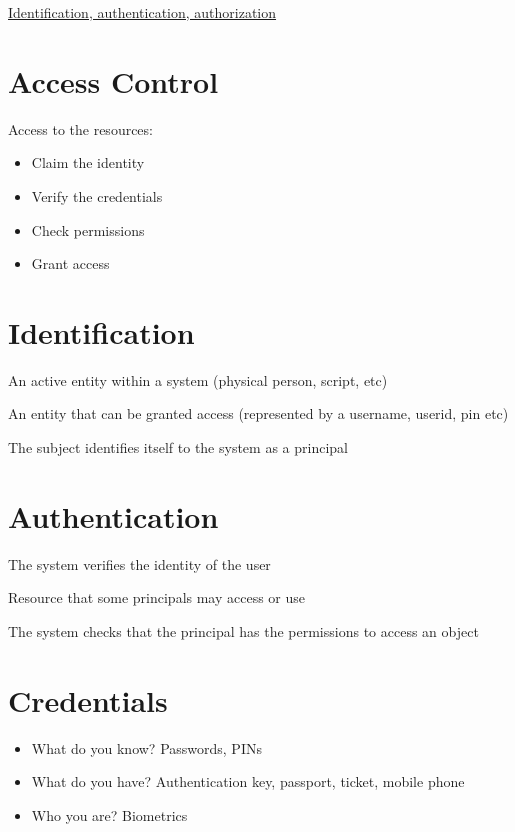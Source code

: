 \documentclass{article}[18pt]
\begin{document}
\begin{center}
\underline{\huge Identification, authentication, authorization}
\end{center}
\section{Access Control}
Access to the resources:
\begin{itemize}
	\item Claim the identity
	\item Verify the credentials
	\item Check permissions
	\item Grant access
\end{itemize}
\section{Identification}
\begin{defin}[Subject]
An active entity within a system (physical person, script, etc)	
\end{defin}
\begin{defin}[Principal]
An entity that can be granted access (represented by a username, userid, pin etc)
\end{defin}
The subject identifies itself to the system as a principal
\section{Authentication}
The system verifies the identity of the user
\begin{defin}[Object]
Resource that some principals may access or use
\end{defin}
The system checks that the principal has the permissions to access an object
\section{Credentials}
\begin{itemize}
	\item What do you know? Passwords, PINs
	\item What do you have? Authentication key, passport, ticket, mobile phone
	\item Who you are? Biometrics
\end{itemize}
\end{document}
